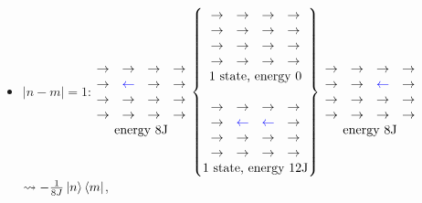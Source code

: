 \begin{itemize}
\item $\vert n -m \vert = 1$:
$\begin{matrix}
	\\
	\begin{matrix} \rightarrow & \rightarrow & \rightarrow & \rightarrow \\  \rightarrow & \textcolor{blue}{\leftarrow} & \rightarrow & \rightarrow \\ \rightarrow & \rightarrow & \rightarrow & \rightarrow \\ \rightarrow & \rightarrow & \rightarrow & \rightarrow \\ \end{matrix} \\
	\text{energy 8J} \\
\end{matrix}$
$\begin{Bmatrix}
	\begin{matrix} \rightarrow & \rightarrow & \rightarrow & \rightarrow \\  \rightarrow & \rightarrow & \rightarrow & \rightarrow \\ \rightarrow & \rightarrow & \rightarrow & \rightarrow \\ \rightarrow & \rightarrow & \rightarrow & \rightarrow \\ \end{matrix} \\
	\text{1 state, energy 0} \\ 
	\\
	\begin{matrix} \rightarrow & \rightarrow & \rightarrow & \rightarrow \\  \rightarrow & \textcolor{blue}{\leftarrow} & \textcolor{blue}{\leftarrow} & \rightarrow \\ \rightarrow & \rightarrow & \rightarrow & \rightarrow \\ \rightarrow & \rightarrow & \rightarrow & \rightarrow \\ \end{matrix} \\
	\text{1 state, energy 12J} \\
\end{Bmatrix}$
$\begin{matrix}
	\\
	\begin{matrix} \rightarrow & \rightarrow & \rightarrow & \rightarrow \\  \rightarrow & \rightarrow & \textcolor{blue}{\leftarrow} & \rightarrow \\ \rightarrow & \rightarrow & \rightarrow & \rightarrow \\ \rightarrow & \rightarrow & \rightarrow & \rightarrow \\ \end{matrix} \\
	\text{energy 8J} \\
\end{matrix}$
$\leadsto - \frac{1}{8J} \ket{n}\bra{m}$, \\
	

\end{itemize}
